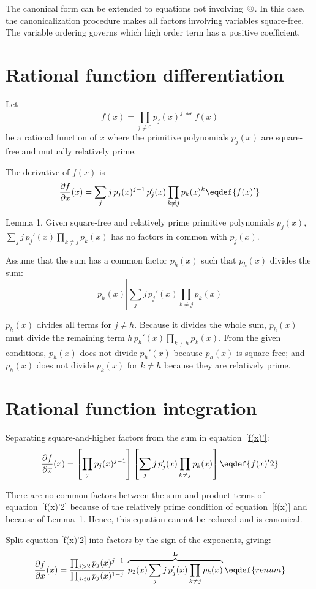 The canonical form can be extended to equations not involving~${@}$.
In this case, the canonicalization procedure makes all factors
involving variables square-free.  The variable ordering governs which
high order term has a positive coefficient.

\section{Rational function differentiation}

Let
$$f(x)=\prod_{j\ne0} p_j(x)^j\eqdef{f(x)}$$
be a rational function of $x$ where the primitive polynomials $p_j(x)$
are square-free and mutually relatively prime.

The derivative of $f(x)$ is
$${\partial{f}\over \partial{x}}(x)=\sum_{j} j\,p_j(x)^{j-1}\,{p_j'}(x)\prod_{k\neq j}p_k(x)^k
  \eqdef{f(x)'}$$

\proclaim Lemma 1. {
Given square-free and relatively prime primitive polynomials $p_j(x)$,
$\sum_{j}j\,{p_j'}(x)\prod_{k\neq j}p_k(x)$ has no factors in common
with $p_j(x)$.}\par

Assume that the sum has a common factor $p_h(x)$ such that $p_h(x)$
divides the sum:
$$p_h(x)\left|\sum_{j}j\,{p_j'}(x)\prod_{k\neq j}p_k(x)\right.$$

$p_h(x)$ divides all terms for $j\neq h$.  Because it divides the
whole sum, $p_h(x)$ must divide the remaining term $h\,p_h'(x)
\prod_{k\neq h} p_k(x)$.  From the given conditions, $p_h(x)$
does not divide $p_h'(x)$ because $p_h(x)$ is square-free; and $p_h(x)$
does not divide $p_k(x)$ for $k\neq h$ because they are relatively
prime.

\section{Rational function integration}

Separating square-and-higher factors from the sum in
equation~\eqref{f(x)'}:
$${\partial{f}\over \partial{x}}(x) = \left[ \prod_j p_j(x)^{j-1} \right]
\left[\sum_j j\,{p_j'}(x)\prod_{k\neq j} p_k(x)\right]\eqdef{f(x)'2}$$

There are no common factors between the sum and product terms of
equation~\eqref{f(x)'2} because of the relatively prime condition of
equation~\eqref{f(x)} and because of Lemma~1.  Hence, this equation
cannot be reduced and is canonical.

Split equation \eqref{f(x)'2} into factors by the sign of the exponents,
giving:
$${\partial{f}\over \partial{x}}(x)
 ={\prod_{j>2}p_j(x)^{j-1}\over\prod_{j<0} p_j(x)^{1-j}}\,
 \overbrace{p_2(x)\,{\sum_{j}j\,{p_j'}(x)\prod_{k\neq j}p_k(x)}}^{\bf L}
\eqdef{renum}$$

